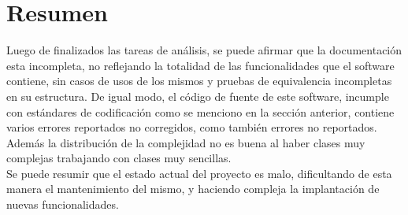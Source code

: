 \section{Resumen}

Luego de finalizados las tareas de análisis, se puede afirmar que la documentación esta incompleta, no reflejando la totalidad de las funcionalidades que el software contiene, sin casos de usos de los mismos y pruebas de equivalencia incompletas en su estructura. De igual modo, el código de fuente de este software, incumple con estándares de codificación como se menciono en la sección anterior, contiene varios errores reportados no corregidos, como también errores no reportados. Además la distribución de la complejidad no es buena al haber clases muy complejas trabajando con clases muy sencillas.\\
Se puede resumir que el estado actual del proyecto es malo, dificultando de esta manera el mantenimiento del mismo, y haciendo compleja la implantación de nuevas funcionalidades.
